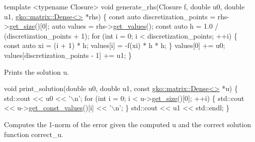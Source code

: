 \begin{DoxyCode}
\textcolor{keyword}{template} <\textcolor{keyword}{typename} Closure>
\textcolor{keywordtype}{void} generate\_rhs(Closure f, \textcolor{keywordtype}{double} u0, \textcolor{keywordtype}{double} u1, \hyperlink{classgko_1_1matrix_1_1Dense}{gko::matrix::Dense<>} *rhs)
\{
    \textcolor{keyword}{const} \textcolor{keyword}{auto} discretization\_points = rhs->\hyperlink{classgko_1_1LinOp_a31b3c003388eb0b95393154f68c2b98d}{get\_size}()[0];
    \textcolor{keyword}{auto} values = rhs->\hyperlink{classgko_1_1matrix_1_1Dense_a3bc458e02fab8e4c9f60f70bd4d5a4f9}{get\_values}();
    \textcolor{keyword}{const} \textcolor{keyword}{auto} h = 1.0 / (discretization\_points + 1);
    \textcolor{keywordflow}{for} (\textcolor{keywordtype}{int} i = 0; i < discretization\_points; ++i) \{
        \textcolor{keyword}{const} \textcolor{keyword}{auto} xi = (i + 1) * h;
        values[i] = -f(xi) * h * h;
    \}
    values[0] += u0;
    values[discretization\_points - 1] += u1;
\}
\end{DoxyCode}


Prints the solution {\ttfamily u}.


\begin{DoxyCode}
\textcolor{keywordtype}{void} print\_solution(\textcolor{keywordtype}{double} u0, \textcolor{keywordtype}{double} u1, \textcolor{keyword}{const} \hyperlink{classgko_1_1matrix_1_1Dense}{gko::matrix::Dense<>} *u)
\{
    std::cout << u0 << \textcolor{charliteral}{'\(\backslash\)n'};
    \textcolor{keywordflow}{for} (\textcolor{keywordtype}{int} i = 0; i < u->\hyperlink{classgko_1_1LinOp_a31b3c003388eb0b95393154f68c2b98d}{get\_size}()[0]; ++i) \{
        std::cout << u->\hyperlink{classgko_1_1matrix_1_1Dense_ab83c739c1b11abaecc3bfd89506f6c9c}{get\_const\_values}()[i] << \textcolor{charliteral}{'\(\backslash\)n'};
    \}
    std::cout << u1 << std::endl;
\}
\end{DoxyCode}


Computes the 1-\/norm of the error given the computed {\ttfamily u} and the correct solution function {\ttfamily correct\+\_\+u}.


